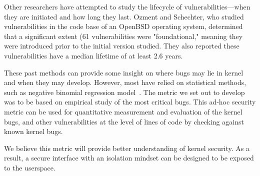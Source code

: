 Other researchers have attempted to study the lifecycle of vulnerabilities—when they are
initiated and how long they last. Ozment and Schechter, who studied
vulnerabilities in the code base of an OpenBSD
operating system, determined that a significant extent (61%
vulnerabilities were "foundational," meaning they were introduced prior to the
initial version studied. They also reported these vulnerabilities
have a median lifetime of at least 2.6
years.

These past methods can provide some insight on where bugs may lie in kernel and when
they may develop. However, most have relied on statistical methods, such as
negative binomial regression model~\cite{Bug-Location}. The metric we set out to
develop was to be based on empirical study of
the most critical bugs. This ad-hoc security metric can be used for
quantitative measurement and evaluation of the kernel bugs,
and other vulnerabilities at the level of lines of code by checking against
known kernel bugs.

We believe this metric will provide better understanding of kernel security.
As a result, a secure interface with an isolation mindset can be designed
to be exposed to the userspace.




